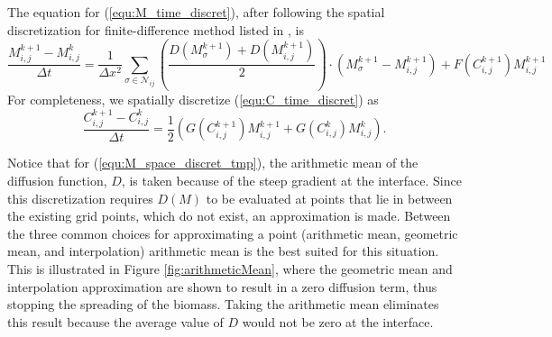The equation for (\ref{equ:M_time_discret}), after following the spatial discretization for finite-difference method listed in \cite{saad2003iterativeMethod}, is
\begin{equation} \label{equ:M_space_discret_tmp}
  \frac{M^{k+1}_{i,j} - M^{k}_{i,j}}{\Delta t} =
    \frac{1}{\Delta x^2} \sum_{\sigma \in \mathcal{N}_{ij}}
    \left( \frac{D(M^{k+1}_{\sigma}) + D(M^{k+1}_{i,j})}{2} \right)
    \cdot \left( M^{k+1}_{\sigma} - M^{k+1}_{i,j} \right)
    + F(C^{k+1}_{i,j}) M^{k+1}_{i,j}
\end{equation}
For completeness, we spatially discretize (\ref{equ:C_time_discret}) as
\begin{equation} \label{equ:C_space_discret_tmp}
  \frac{C^{k+1}_{i,j} - C^{k}_{i,j}}{\Delta t} = \frac{1}{2} ( G(C^{k+1}_{i,j}) M^{k+1}_{i,j} + G(C^{k}_{i,j}) M^{k}_{i,j} ).
\end{equation}

Notice that for (\ref{equ:M_space_discret_tmp}), the arithmetic mean of the diffusion function, $D$, is taken because of the steep gradient at the interface.
Since this discretization requires $D(M)$ to be evaluated at points that lie in between the existing grid points, which do not exist, an approximation is made.
Between the three common choices for approximating a point (arithmetic mean, geometric mean, and interpolation) arithmetic mean is the best suited for this situation.
This is illustrated in Figure \ref{fig:arithmeticMean}, where the geometric mean and interpolation approximation are shown to result in a zero diffusion term, thus stopping the spreading of the biomass.
Taking the arithmetic mean eliminates this result because the average value of $D$ would not be zero at the interface.

